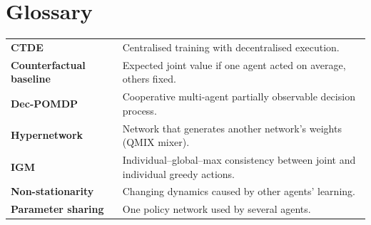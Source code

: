 \documentclass[11pt]{article}
\begin{document}
\section{Glossary}
\begin{center}\small\renewcommand{\arraystretch}{1.2}
\begin{tabularx}{\textwidth}{>{\bfseries}p{3.3cm}X}\toprule
CTDE & Centralised training with decentralised execution.\\
Counterfactual baseline & Expected joint value if one agent acted on average, others fixed.\\
Dec-POMDP & Cooperative multi-agent partially observable decision process.\\
Hypernetwork & Network that generates another network's weights (QMIX mixer).\\
IGM & Individual--global--max consistency between joint and individual greedy actions.\\
Non-stationarity & Changing dynamics caused by other agents' learning.\\
Parameter sharing & One policy network used by several agents.\\\bottomrule
\end{tabularx}\end{center}
\end{document}
